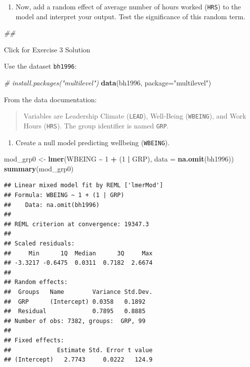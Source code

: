 \documentclass[
]{book}
\newenvironment{Shaded}{\begin{snugshade}}{\end{snugshade}}
\newcommand{\CommentTok}[1]{\textcolor[rgb]{0.56,0.35,0.01}{\textit{#1}}}
\newcommand{\DataTypeTok}[1]{\textcolor[rgb]{0.13,0.29,0.53}{#1}}
\newcommand{\DecValTok}[1]{\textcolor[rgb]{0.00,0.00,0.81}{#1}}
\newcommand{\KeywordTok}[1]{\textcolor[rgb]{0.13,0.29,0.53}{\textbf{#1}}}
\newcommand{\NormalTok}[1]{#1}
\newcommand{\OperatorTok}[1]{\textcolor[rgb]{0.81,0.36,0.00}{\textbf{#1}}}
\newcommand{\StringTok}[1]{\textcolor[rgb]{0.31,0.60,0.02}{#1}}
\providecommand{\tightlist}{%
  \setlength{\itemsep}{0pt}\setlength{\parskip}{0pt}}
\begin{document}
\begin{enumerate}
\def\labelenumi{\arabic{enumi}.}
\setcounter{enumi}{3}
\tightlist
\item
  Now, add a random effect of average number of hours worked (\texttt{HRS}) to the model and interpret your output. Test the significance of this random term.
\end{enumerate}

\begin{Shaded}
\begin{Highlighting}[]
\CommentTok{\#\# }
\end{Highlighting}
\end{Shaded}

{Click for Exercise 3 Solution}

Use the dataset \texttt{bh1996}:

\begin{Shaded}
\begin{Highlighting}[]
  \CommentTok{\# install.packages("multilevel")}
  \KeywordTok{data}\NormalTok{(bh1996, }\DataTypeTok{package=}\StringTok{"multilevel"}\NormalTok{)}
\end{Highlighting}
\end{Shaded}

From the data documentation:

\begin{quote}
Variables are Leadership Climate (\texttt{LEAD}), Well-Being (\texttt{WBEING}), and Work Hours (\texttt{HRS}). The group identifier is named \texttt{GRP}.
\end{quote}

\begin{enumerate}
\def\labelenumi{\arabic{enumi}.}
\tightlist
\item
  Create a null model predicting wellbeing (\texttt{WBEING}).
\end{enumerate}

\begin{Shaded}
\begin{Highlighting}[]
\NormalTok{  mod\_grp0 \textless{}{-}}\StringTok{ }\KeywordTok{lmer}\NormalTok{(WBEING }\OperatorTok{\textasciitilde{}}\StringTok{ }\DecValTok{1} \OperatorTok{+}\StringTok{ }\NormalTok{(}\DecValTok{1} \OperatorTok{|}\StringTok{ }\NormalTok{GRP), }\DataTypeTok{data =} \KeywordTok{na.omit}\NormalTok{(bh1996))}
  \KeywordTok{summary}\NormalTok{(mod\_grp0)}
\end{Highlighting}
\end{Shaded}

\begin{verbatim}
## Linear mixed model fit by REML ['lmerMod']
## Formula: WBEING ~ 1 + (1 | GRP)
##    Data: na.omit(bh1996)
## 
## REML criterion at convergence: 19347.3
## 
## Scaled residuals: 
##     Min      1Q  Median      3Q     Max 
## -3.3217 -0.6475  0.0311  0.7182  2.6674 
## 
## Random effects:
##  Groups   Name        Variance Std.Dev.
##  GRP      (Intercept) 0.0358   0.1892  
##  Residual             0.7895   0.8885  
## Number of obs: 7382, groups:  GRP, 99
## 
## Fixed effects:
##             Estimate Std. Error t value
## (Intercept)   2.7743     0.0222   124.9
\end{verbatim}
\end{document}
